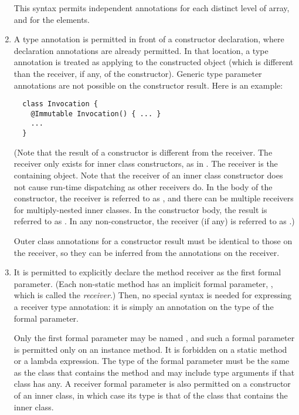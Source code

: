 \documentclass[10pt]{article}
\newcommand{\preverbnegspace}{\vspace{-5pt}}
\begin{document}
\begin{enumerate}
\preverbnegspace
This syntax permits independent annotations for each distinct level of
array, and for the elements.

\item
A type annotation is permitted in front of a constructor
declaration, where declaration annotations are already permitted.  In that
location, a type annotation is treated as applying to the constructed
object (which is different than the receiver, if any, of the constructor).
Generic type parameter annotations are not
possible on the constructor result.
%
  Here is an example:
\preverbnegspace
\begin{Verbatim}
  class Invocation {
    @Immutable Invocation() { ... }
    ...
  }
\end{Verbatim}
\preverbnegspace

(Note that the result of a constructor is different from the receiver.  The
receiver only exists for inner class constructors, as in
.  The receiver is the containing
object.
Note that the receiver of an inner class constructor does not cause run-time
dispatching as other receivers do.
In the body of the constructor, the receiver is referred to as
, and there can be multiple receivers for
multiply-nested inner classes.
  In the constructor body, the result is referred to as
.  In any non-constructor, the receiver (if any) is referred to
as .)

Outer class annotations for a constructor result must be identical to
those on the receiver, so they can be inferred from the annotations on the
receiver.

\item
  \label{type-annotation-locations-receiver}%
  It is permitted to explicitly declare the method receiver as the first
  formal parameter.
  (Each non-static method has an implicit formal parameter, , which is
  called the \emph{receiver}.)
  Then, no special
  syntax is needed for expressing a receiver type annotation:  it is simply an
  annotation on the type of the  formal parameter.

  Only the first formal parameter may be
  named , and such a formal parameter is permitted only on an instance
  method.  It is forbidden on a static method or a lambda expression.  The type
  of the  formal parameter must be the same as the class that contains
  the method and may include type arguments if that class has any.
  A receiver  formal parameter is also permitted on a
  constructor of an inner class, in which case its type is that of the
  class that contains the inner class.


\end{enumerate}
\end{document}
